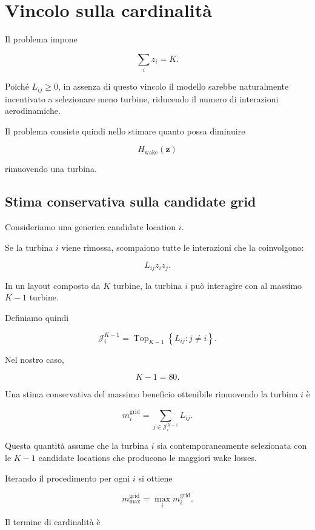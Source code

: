 \documentclass[11pt,a4paper]{report}
\begin{document}
\section{Vincolo sulla cardinalità}

Il problema impone

\[
\sum_i z_i = K.
\]

Poiché $L_{ij}\geq 0$, in assenza di questo vincolo il modello sarebbe
naturalmente incentivato a selezionare meno turbine, riducendo il numero
di interazioni aerodinamiche.

Il problema consiste quindi nello stimare quanto possa diminuire

\[
H_{\mathrm{wake}}(\mathbf z)
\]

rimuovendo una turbina.

\subsection{Stima conservativa sulla candidate grid}

Consideriamo una generica candidate location $i$.

Se la turbina $i$ viene rimossa, scompaiono tutte le interazioni che la
coinvolgono:

\[
L_{ij}z_i z_j.
\]

In un layout composto da $K$ turbine, la turbina $i$ può interagire con
al massimo $K-1$ turbine.

Definiamo quindi

\[
\mathcal J_i^{K-1}
=
\operatorname{Top}_{K-1}
\left\{
L_{ij}:j\neq i
\right\}.
\]

Nel nostro caso,

\[
K-1=80.
\]

Una stima conservativa del massimo beneficio ottenibile rimuovendo la
turbina $i$ è

\[
m_i^{\mathrm{grid}}
=
\sum_{j\in\mathcal J_i^{K-1}}
L_{ij}.
\]

Questa quantità assume che la turbina $i$ sia contemporaneamente
selezionata con le $K-1$ candidate locations che producono le maggiori
wake losses.

Iterando il procedimento per ogni $i$ si ottiene

\[
m_{\max}^{\mathrm{grid}}
=
\max_i
m_i^{\mathrm{grid}}.
\]

Il termine di cardinalità è
\end{document}
